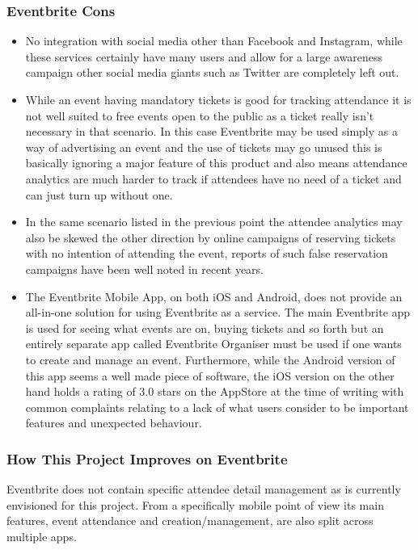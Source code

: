 \subsubsection{Eventbrite Cons}

\begin{itemize}
    \item No integration with social media other than Facebook and Instagram, while these services certainly have many users and allow for a large awareness campaign other social media giants such as Twitter are completely left out.
    \item While an event having mandatory tickets is good for tracking attendance it is not well suited to free events open to the public as a ticket really isn't necessary in that scenario. In this case Eventbrite may be used simply as a way of advertising an event and the use of tickets may go unused this is basically ignoring a major feature of this product and also means attendance analytics are much harder to track if attendees have no need of a ticket and can just turn up without one.
    \item In the same scenario listed in the previous point the attendee analytics may also be skewed the other direction by online campaigns of reserving tickets with no intention of attending the event, reports of such false reservation campaigns have been well noted in recent years.
    \item The Eventbrite Mobile App, on both iOS and Android, does not provide an all-in-one solution for using Eventbrite as a service. The main Eventbrite app is used for seeing what events are on, buying tickets and so forth but an entirely separate app called Eventbrite Organiser must be used if one wants to create and manage an event. Furthermore, while the Android version of this app seems a well made piece of software, the iOS version on the other hand holds a rating of 3.0 stars on the AppStore\cite{eventbriteorganiseriosapp} at the time of writing with common complaints relating to a lack of what users consider to be important features and unexpected behaviour.
\end{itemize}

\subsubsection{How This Project Improves on Eventbrite}

Eventbrite does not contain specific attendee detail management as is currently envisioned for this project. From a specifically mobile point of view its main features, event attendance and creation/management, are also split across multiple apps. 

